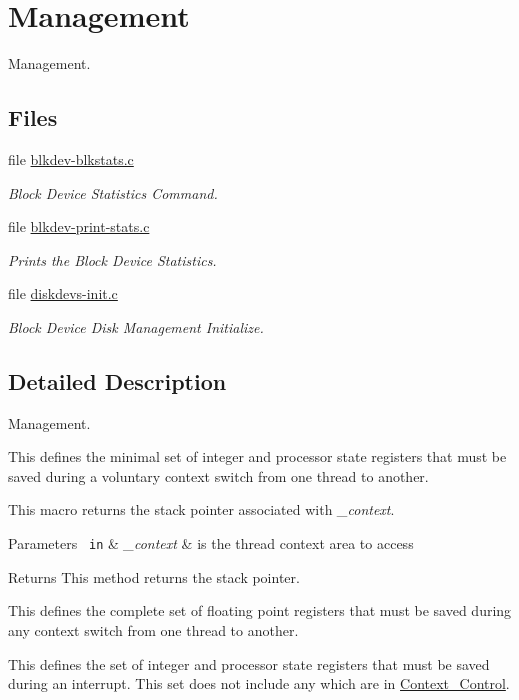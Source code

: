 \hypertarget{group__Management}{}\section{Management}
\label{group__Management}


Management.  


\subsection*{Files}
\begin{DoxyCompactItemize}
\item 
file \mbox{\hyperlink{blkdev-blkstats_8c}{blkdev-\/blkstats.\+c}}
\begin{DoxyCompactList}\small\item\em Block Device Statistics Command. \end{DoxyCompactList}\item 
file \mbox{\hyperlink{blkdev-print-stats_8c}{blkdev-\/print-\/stats.\+c}}
\begin{DoxyCompactList}\small\item\em Prints the Block Device Statistics. \end{DoxyCompactList}\item 
file \mbox{\hyperlink{diskdevs-init_8c}{diskdevs-\/init.\+c}}
\begin{DoxyCompactList}\small\item\em Block Device Disk Management Initialize. \end{DoxyCompactList}\end{DoxyCompactItemize}


\subsection{Detailed Description}
Management. 

This defines the minimal set of integer and processor state registers that must be saved during a voluntary context switch from one thread to another.

This macro returns the stack pointer associated with {\itshape \+\_\+context}.


\begin{DoxyParams}[1]{Parameters}
\mbox{\texttt{ in}}  & {\em \+\_\+context} & is the thread context area to access\\
\hline
\end{DoxyParams}
\begin{DoxyReturn}{Returns}
This method returns the stack pointer.
\end{DoxyReturn}
This defines the complete set of floating point registers that must be saved during any context switch from one thread to another.

This defines the set of integer and processor state registers that must be saved during an interrupt. This set does not include any which are in \mbox{\hyperlink{structContext__Control}{Context\+\_\+\+Control}}. 